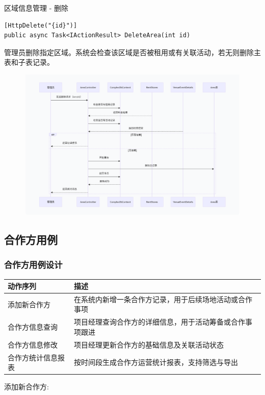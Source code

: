 \documentclass[]{article}
\begin{document}
区域信息管理 - 删除

\begin{verbatim}
[HttpDelete("{id}")]
public async Task<IActionResult> DeleteArea(int id)
\end{verbatim}
管理员删除指定区域。系统会检查该区域是否被租用或有关联活动，若无则删除主表和子表记录。

\includegraphics[width=5.64167in,height=2.86458in]{media/media/image_2-3-7.png}

\hypertarget{ux7528ux4f8b-2}{%
  \subsection{合作方用例}\label{ux7528ux4f8b-2}}

\hypertarget{ux7528ux4f8b-2ux8bbeux8ba1}{%
  \subsubsection{合作方用例设计}\label{ux7528ux4f8b-2ux8bbeux8ba1}}

\begin{longtable}[]{@{}ll@{}}
  \toprule
  \textbf{动作序列} & \textbf{描述}                  \\
  \midrule
  \endhead
  添加新合作方        & 在系统内新增一条合作方记录，用于后续场地活动或合作事项  \\
  合作方信息查询       & 项目经理查询合作方的详细信息，用于活动筹备或合作事项跟进 \\
  合作方信息修改       & 项目经理更新合作方的基础信息及关联活动状态        \\
  合作方统计信息报表     & 按时间段生成合作方运营统计报表，支持筛选与导出      \\
  \bottomrule
\end{longtable}

添加新合作方:
\end{document}
